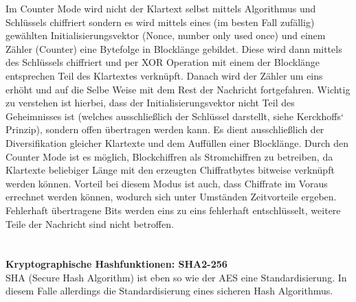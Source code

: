 \documentclass[12pt,a4paper,bibliography=totocnumbered,listof=totocnumbered]{scrartcl}
\begin{document}
Im Counter Mode wird nicht der Klartext selbst mittels Algorithmus und Schlüssels chiffriert sondern es wird mittels eines (im besten Fall zufällig) gewählten Initialisierungsvektor (Nonce, number only used once) und einem Zähler (Counter) eine Bytefolge in Blocklänge gebildet. Diese wird dann mittels des Schlüssels chiffriert und per XOR Operation mit einem der Blocklänge entsprechen Teil des Klartextes verknüpft. Danach wird der Zähler um eins erhöht und auf die Selbe Weise mit dem Rest der Nachricht fortgefahren. Wichtig zu verstehen ist hierbei, dass der Initialisierungsvektor nicht Teil des Geheimnisses ist (welches ausschließlich der Schlüssel darstellt, siehe Kerckhoffs‘ Prinzip), sondern offen übertragen werden kann. Es dient ausschließlich der Diversifikation gleicher Klartexte und dem Auffüllen einer Blocklänge. Durch den Counter Mode ist es möglich, Blockchiffren als Stromchiffren zu betreiben, da Klartexte beliebiger Länge mit den erzeugten Chiffratbytes bitweise verknüpft werden können. Vorteil bei diesem Modus ist auch, dass Chiffrate im Voraus errechnet werden können, wodurch sich unter Umständen Zeitvorteile ergeben. Fehlerhaft übertragene Bits werden eins zu eins fehlerhaft entschlüsselt, weitere Teile der Nachricht sind nicht betroffen.
\\\cite{6}\cite{7}\\
\\\textbf{Kryptographische Hashfunktionen: SHA2-256}\\
SHA (Secure Hash Algorithm) ist eben so wie der AES eine Standardisierung. In diesem Falle allerdings die Standardisierung eines sicheren Hash Algorithmus. 
\end{document}
